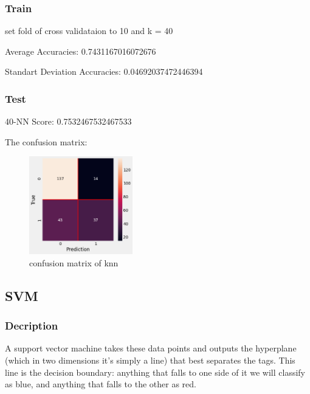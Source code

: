\documentclass[11pt,en]{elegantpaper}
\begin{document}
\subsubsection{Train}
set fold of cross validataion to 10 and k = 40

Average Accuracies:  0.7431167016072676

Standart Deviation Accuracies:  0.04692037472446394

\subsubsection{Test}
40-NN Score: 0.7532467532467533

The confusion matrix:
\begin{figure}[H]
    \centering
    \includegraphics[width=0.4\textwidth]{figure/conmat-knn.png}
    \caption{confusion matrix of knn}
\end{figure}

\subsection{SVM}
\subsubsection{Decription}
A support vector machine takes these data points and outputs the hyperplane (which in two dimensions it’s simply a line) that best separates the tags. This line is the decision boundary: anything that falls to one side of it we will classify as blue, and anything that falls to the other as red.
\end{document}
